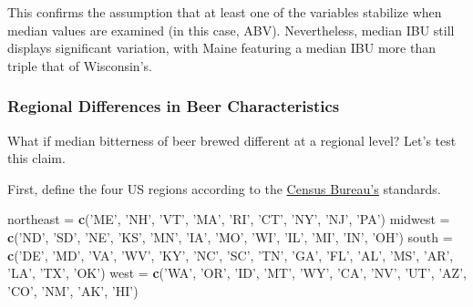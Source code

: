 \documentclass[]{article}
\newenvironment{Shaded}{\begin{snugshade}}{\end{snugshade}}
\newcommand{\KeywordTok}[1]{\textcolor[rgb]{0.13,0.29,0.53}{\textbf{#1}}}
\newcommand{\NormalTok}[1]{#1}
\newcommand{\StringTok}[1]{\textcolor[rgb]{0.31,0.60,0.02}{#1}}
\begin{document}
This confirms the assumption that at least one of the variables
stabilize when median values are examined (in this case, ABV).
Nevertheless, median IBU still displays significant variation, with
Maine featuring a median IBU more than triple that of Wisconsin's.

\hypertarget{regional-differences-in-beer-characteristics}{%
\subsubsection{Regional Differences in Beer
Characteristics}\label{regional-differences-in-beer-characteristics}}

What if median bitterness of beer brewed different at a regional level?
Let's test this claim.

First, define the four US regions according to the
\href{https://www.businessinsider.com/regions-of-united-states-2018-5}{Census
Bureau's} standards.

\begin{Shaded}
\begin{Highlighting}[]
\NormalTok{northeast =}\StringTok{ }\KeywordTok{c}\NormalTok{(}\StringTok{'ME'}\NormalTok{, }\StringTok{'NH'}\NormalTok{, }\StringTok{'VT'}\NormalTok{, }\StringTok{'MA'}\NormalTok{, }\StringTok{'RI'}\NormalTok{, }\StringTok{'CT'}\NormalTok{, }\StringTok{'NY'}\NormalTok{, }\StringTok{'NJ'}\NormalTok{, }\StringTok{'PA'}\NormalTok{)}
\NormalTok{midwest =}\StringTok{ }\KeywordTok{c}\NormalTok{(}\StringTok{'ND'}\NormalTok{, }\StringTok{'SD'}\NormalTok{, }\StringTok{'NE'}\NormalTok{, }\StringTok{'KS'}\NormalTok{, }\StringTok{'MN'}\NormalTok{, }\StringTok{'IA'}\NormalTok{, }\StringTok{'MO'}\NormalTok{, }\StringTok{'WI'}\NormalTok{, }\StringTok{'IL'}\NormalTok{, }\StringTok{'MI'}\NormalTok{, }\StringTok{'IN'}\NormalTok{, }\StringTok{'OH'}\NormalTok{)}
\NormalTok{south =}\StringTok{ }\KeywordTok{c}\NormalTok{(}\StringTok{'DE'}\NormalTok{, }\StringTok{'MD'}\NormalTok{, }\StringTok{'VA'}\NormalTok{, }\StringTok{'WV'}\NormalTok{, }\StringTok{'KY'}\NormalTok{, }\StringTok{'NC'}\NormalTok{, }\StringTok{'SC'}\NormalTok{, }\StringTok{'TN'}\NormalTok{, }\StringTok{'GA'}\NormalTok{, }\StringTok{'FL'}\NormalTok{, }\StringTok{'AL'}\NormalTok{, }\StringTok{'MS'}\NormalTok{, }\StringTok{'AR'}\NormalTok{, }\StringTok{'LA'}\NormalTok{, }\StringTok{'TX'}\NormalTok{, }\StringTok{'OK'}\NormalTok{)}
\NormalTok{west =}\StringTok{ }\KeywordTok{c}\NormalTok{(}\StringTok{'WA'}\NormalTok{, }\StringTok{'OR'}\NormalTok{, }\StringTok{'ID'}\NormalTok{, }\StringTok{'MT'}\NormalTok{, }\StringTok{'WY'}\NormalTok{, }\StringTok{'CA'}\NormalTok{, }\StringTok{'NV'}\NormalTok{, }\StringTok{'UT'}\NormalTok{, }\StringTok{'AZ'}\NormalTok{, }\StringTok{'CO'}\NormalTok{, }\StringTok{'NM'}\NormalTok{, }\StringTok{'AK'}\NormalTok{, }\StringTok{'HI'}\NormalTok{)}
\end{Highlighting}
\end{Shaded}
\end{document}
